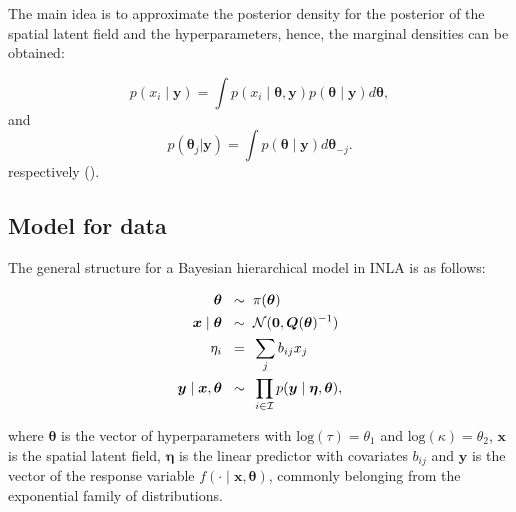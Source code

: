 \documentclass{article}
\begin{document}
The main idea is to approximate the posterior density for the posterior of the spatial latent field and the hyperparameters, hence, the marginal densities can be obtained:

\begin{equation} \label{eqn:eq3}
p(x_i \mid \boldsymbol{y}) = \int p(x_i \mid \boldsymbol{\theta},\boldsymbol{y})  p(\boldsymbol{\theta} \mid \boldsymbol{y}) d\boldsymbol{\theta},
\end{equation}
and
\begin{equation} \label{eqn:eq4}
p(\boldsymbol{\theta}_j|\boldsymbol{y}) = \int p(\boldsymbol{\theta} \mid \boldsymbol{y})  d\boldsymbol{\theta}_{-j}.
\end{equation}
respectively (\cite{lindgren2015bayesian}\cite{krainski2018advanced}). \\

\subsection{Model for data}

The general structure for a Bayesian hierarchical model in INLA is as follows:


\begin{align}
\boldsymbol{\theta} \hspace{2mm} \sim & \hspace{2mm} \pi(\boldsymbol{\theta}) \label{eqn:eq5}\\
\boldsymbol{x} \mid \boldsymbol{\theta} \hspace{2mm} \sim & \hspace{2mm} \mathcal{N}(\boldsymbol{0}, \boldsymbol{Q}(\boldsymbol{\theta})^{-1}) \label{eqn:eq6}\\
\eta_{i} \hspace{2mm} = & \hspace{2mm} \sum_{j}b_{ij}x_{j}\label{eqn:eq7}\\
\boldsymbol{y} \mid \boldsymbol{x}, \boldsymbol{\theta} \hspace{2mm} \sim & \hspace{2mm} \prod_{i \in \mathcal{I}}p(\boldsymbol{y} \mid \boldsymbol{\eta}, \boldsymbol{\theta}) \label{eqn:eq8},
\end{align}

where $\boldsymbol{\theta}$ is the vector of hyperparameters with $\text{log}(\tau) = \theta_{1}$ and $\text{log}(\kappa) = \theta_{2}$,  $\boldsymbol{x}$ is the spatial latent field, $\boldsymbol{\eta}$ is the linear predictor with covariates $b_{ij}$ and $\boldsymbol{y}$ is the vector of the response variable $f(\cdot \mid \boldsymbol{x}, \boldsymbol{\theta})$, commonly belonging from the exponential family of distributions. 
\vspace{0.2cm}
\end{document}
